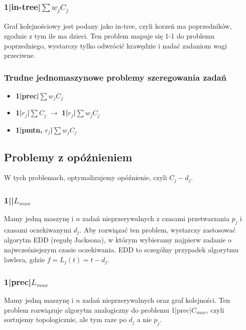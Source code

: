 \documentclass{../notatki}
\begin{document}
\subsubsection{1|in-tree|\texorpdfstring{$\sum w_jC_j$}{sum wjCj}}

Graf kolejnościowy jest podany jako in-tree, czyli korzeń ma
poprzedników, zgodnie z tym ile ma dzieci.
Ten problem mapuje się 1-1 do problemu poprzedniego, wystarczy tylko
odwrócić krawędzie i nadać zadaniom wagi przeciwne.

\subsubsection{Trudne jednomaszynowe problemy szeregowania zadań}

\begin{itemize}
  \item \textbf{1|prec|$\sum w_j C_j$}
  \item \textbf{1|$r_j$|$\sum C_j$} $\rightarrow$
    \textbf{1|$r_j$|$\sum w_j C_j$}
  \item \textbf{1|pmtn, $r_j$|$\sum w_j C_j$}
\end{itemize}

\subsection{Problemy z opóźnieniem}

W tych problemach, optymalizujemy opóźnienie, czyli $C_j - d_j$.

\subsubsection{1||\texorpdfstring{$L_{max}$}{Lmax}}

Mamy jedną maszynę i $n$ zadań nieprzerywalnych z czasami przetwarzania $p_j$
i czasami oczekiwanymi $d_j$. Aby rozwiązać ten problem, wystarczy zastosować
algorytm EDD (regułę Jacksona), w którym wybieramy najpierw zadanie o
najwcześniejszym czasie oczekiwania. EDD to sczególny przypadek
algorytmu lawlera, gdzie $f = L_j(t) = t - d_j$.

\subsubsection{1|prec|\texorpdfstring{$L_{max}$}{Lmax}}

Mamy jedną maszynę i $n$ zadań nieprzerywalnych oraz graf kolejności.
Ten problem rozwiązuje algorytm analogiczny do problemu 1|prec|$C_{max}$, czyli
sortujemy topologicznie, ale tym raze po $d_j$ a nie $p_j$.
\end{document}
